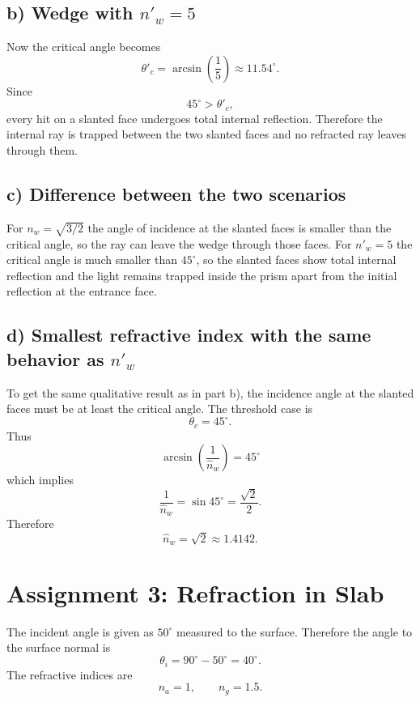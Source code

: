 \documentclass[a4paper,11pt]{article}
\begin{document}
\subsection*{b) Wedge with $n'_w = 5$}
Now the critical angle becomes
\[
\theta'_c = \arcsin\left(\frac{1}{5}\right) \approx 11.54^\circ.
\]
Since
\[
45^\circ > \theta'_c,
\]
every hit on a slanted face undergoes total internal reflection. Therefore the internal ray is trapped between the two slanted faces and no refracted ray leaves through them.

\begin{center}
\end{center}

\subsection*{c) Difference between the two scenarios}
For $n_w = \sqrt{3/2}$ the angle of incidence at the slanted faces is smaller than the critical angle, so the ray can leave the wedge through those faces. For $n'_w = 5$ the critical angle is much smaller than $45^\circ$, so the slanted faces show total internal reflection and the light remains trapped inside the prism apart from the initial reflection at the entrance face.

\subsection*{d) Smallest refractive index with the same behavior as $n'_w$}
To get the same qualitative result as in part b), the incidence angle at the slanted faces must be at least the critical angle. The threshold case is
\[
\theta_c = 45^\circ.
\]
Thus
\[
\arcsin\left(\frac{1}{\hat n_w}\right) = 45^\circ
\]
which implies
\[
\frac{1}{\hat n_w} = \sin 45^\circ = \frac{\sqrt{2}}{2}.
\]
Therefore
\[
\boxed{\hat n_w = \sqrt{2} \approx 1.4142.}
\]

\section*{Assignment 3: Refraction in Slab}
The incident angle is given as $50^\circ$ measured to the surface. Therefore the angle to the surface normal is
\[
\theta_i = 90^\circ - 50^\circ = 40^\circ.
\]
The refractive indices are
\[
n_a = 1,
\qquad
n_g = 1.5.
\]
\end{document}
